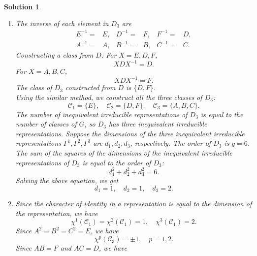 \documentclass[UTF8,10pt,a4paper]{article}
\theoremstyle{Problem}
\theoremstyle{Solution}
\newtheorem*{sol}{Solution}
\begin{document}
\begin{sol}
    \begin{enumerate}
        \item[(a)] The inverse of each element in $D_3$ are
        \begin{align}
            E^{-1}=&E,&D^{-1}=&F,&F^{-1}=&D,\\
            A^{-1}=&A,&B^{-1}=&B,&C^{-1}=&C.
        \end{align}
        Constructing a class from $D$: For $X=E,D,F$,
        \begin{equation}
            XDX^{-1}=D.
        \end{equation}
        For $X=A,B,C$,
        \begin{equation}
            XDX^{-1}=F.
        \end{equation}
        The class of $D_3$ constructed from $D$ is $\{D,F\}$.\\
        Using the similar method, we construct all the three classes of $D_3$:
        \[
            \mathcal{C}_1=\{E\},\quad\mathcal{C}_2=\{D,F\},\quad\mathcal{C}_3=\{A,B,C\}.
        \]
        The number of inequivalent irreducible representations of $D_3$ is equal to the number of classes of $G$, so $D_3$ has three inequivalent irreducible representations. Suppose the dimensions of the three inequivalent irreducible representations $\Gamma^1,\Gamma^2,\Gamma^3$ are $d_1,d_2,d_3$, respectively. The order of $D_3$ is $g=6$. The sum of the squares of the dimensions of the inequivalent irreducible representations of $D_3$ is equal to the order of $D_3$:
        \begin{equation}
            d_1^2+d_2^2+d_3^2=6.
        \end{equation}
        Solving the above equation, we get
        \begin{equation}
            d_1=1,\quad d_2=1,\quad d_3=2.
        \end{equation}
        \item[(b)] Since the character of identity in a representation is equal to the dimension of the representation, we have
        \begin{equation}
            \chi^1(\mathcal{C}_1)=\chi^2(\mathcal{C}_1)=1,\quad\chi^3(\mathcal{C}_1)=2.
        \end{equation}
        Since $A^2=B^2=C^2=E$, we have
        \begin{equation}
            \chi^p(\mathcal{C}_3)=\pm 1,\quad p=1,2.
        \end{equation}
        Since $AB=F$ and $AC=D$, we have

\end{enumerate}
\end{sol}
\end{document}
